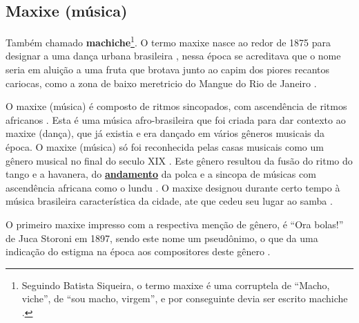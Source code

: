 \subsection{Maxixe (música)}
\label{subsec:maxixe}
Também chamado \textbf{machiche}\footnote{Seguindo Batista Siqueira, 
o termo maxixe é uma corruptela de ``Macho, viche'', 
de ``sou macho, virgem'', e por conseguinte devia ser escrito machiche \cite[pp. 198]{dourado2004dicionario}.}.
O termo maxixe nasce ao redor de 1875 para designar a uma dança urbana brasileira \cite[pp. 465]{marcondes1977enciclopedia} \cite[pp. 198]{dourado2004dicionario},
nessa época se acreditava que o nome seria em aluição a uma fruta que brotava junto ao capim dos piores recantos cariocas,
como a zona de baixo meretricio do Mangue do Rio de Janeiro \cite[pp. 198]{dourado2004dicionario}.

O maxixe (música) é composto de ritmos sincopados, com ascendência de ritmos africanos \cite[pp. 198]{dourado2004dicionario}.
Esta é uma música afro-brasileira \cite[pp. 4]{musicasambavariasdef1} 
que foi criada para dar contexto ao  maxixe (dança), que já existia e era dançado em vários gêneros musicais da época.
O maxixe (música) só foi reconhecida pelas casas musicais como um gênero musical no final do seculo XIX \cite[pp. 465]{marcondes1977enciclopedia}. 
Este gênero resultou da fusão do ritmo do tango e a havanera, 
do \hyperref[sec:Andamento]{\textbf{andamento}} da polca e 
a sincopa de músicas com ascendência africana como o lundu  \cite[pp. 29]{efege1974maxixe}  \cite[pp. 465]{marcondes1977enciclopedia}. 
O maxixe designou durante certo tempo à música brasileira característica da cidade, 
ate que cedeu seu lugar ao samba \cite[pp. 4]{musicasambavariasdef1}.

O primeiro maxixe impresso com a respectiva menção de gênero, é ``Ora bolas!'' de Juca Storoni em 1897,
sendo este nome um pseudônimo, o que da uma indicação do estigma na época aos compositores deste gênero \cite[pp. 80]{sandroni2001feitico} \cite[pp. 108]{efege1974maxixe}.

